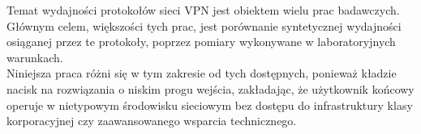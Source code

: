 Temat wydajności protokołów sieci VPN jest obiektem wielu prac badawczych. Głównym celem, większości tych prac, jest porównanie syntetycznej wydajności osiąganej przez te protokoły, poprzez pomiary wykonywane w laboratoryjnych warunkach. \cite{S7ZE,JP59,CH57,E2K5}\\

Niniejsza praca różni się w tym zakresie od tych dostępnych, ponieważ kładzie nacisk na rozwiązania o niskim progu wejścia, zakładając, że użytkownik końcowy operuje w nietypowym środowisku sieciowym bez dostępu do infrastruktury klasy korporacyjnej czy zaawansowanego wsparcia technicznego.